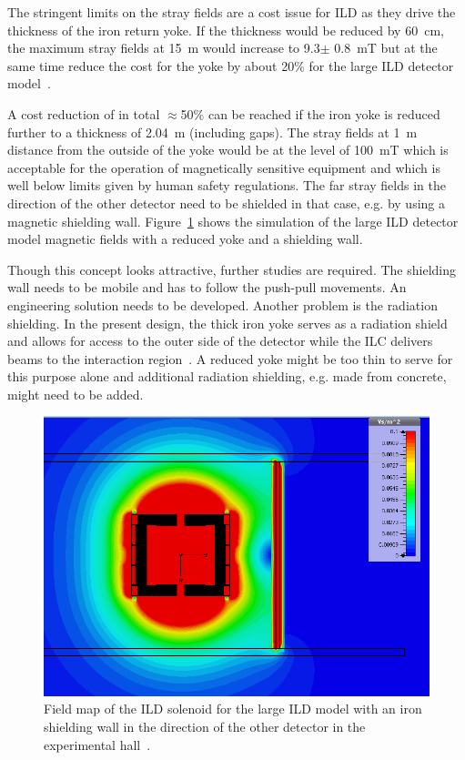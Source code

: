 The stringent limits on the stray fields are a cost issue for ILD as they drive the thickness of the iron return yoke. If the thickness would be reduced by 60~cm, the maximum stray fields at 15~m would increase to 9.3$\pm$ 0.8~mT but at the same time reduce the cost for the yoke by about 20\% for the large ILD detector model~\cite{ild:bib:Magnet_Simulations}.

A cost reduction of in total $\approx$50\% can be reached if the iron yoke is reduced further to a thickness of 2.04~m (including gaps). The stray fields at 1~m distance from the outside of the yoke would be at the level of 100~mT which is acceptable for the operation of magnetically sensitive equipment and which is well below limits given by human safety regulations. The far stray fields in the direction of the other detector need to be shielded in that case, e.g. by using a magnetic shielding wall. Figure~\ref{ILD:fig:magnet_wall} shows the simulation of the large ILD detector model magnetic fields with a reduced yoke and a shielding wall.

Though this concept looks attractive, further studies are required. The shielding wall needs to be mobile and has to follow the push-pull movements. An engineering solution needs to be developed. Another problem is the radiation shielding. In the present design, the thick iron yoke serves as a radiation shield and allows for access to the outer side of the detector while the ILC delivers beams to the interaction region~\cite{ild:bib:Radiation_Hall}. A reduced yoke might be too thin to serve for this purpose alone and additional radiation shielding, e.g. made from concrete, might need to be added. 
\begin{figure}[htb]
    \centering
    \includegraphics[width=0.5\hsize]{Integration/fig/magnet_wall.png}
    \caption{Field map of the ILD solenoid for the large ILD model with an iron shielding wall in the direction of the other detector in the experimental hall~\cite{ild:bib:Magnet_Simulations}.}
    \label{ILD:fig:magnet_wall}
\end{figure}



